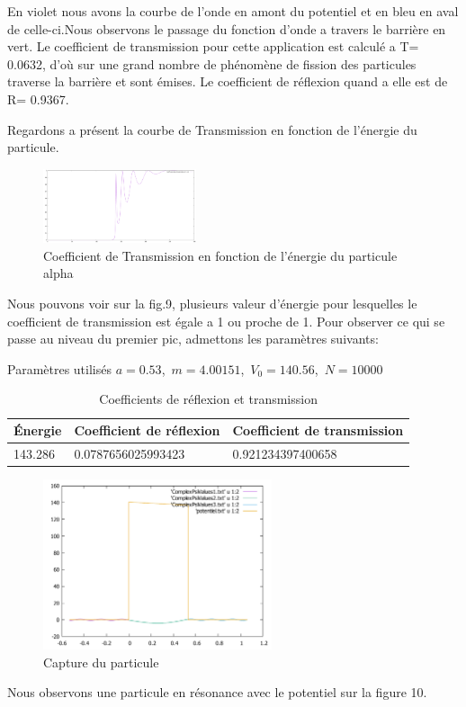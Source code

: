 \par En violet nous avons la courbe de l'onde en amont du potentiel et en bleu en aval de celle-ci.Nous observons le passage du fonction d'onde a travers le barrière en vert. Le coefficient de transmission pour cette application est calculé a T= 0.0632, d'où sur une grand nombre de phénomène de fission des particules traverse la barrière et sont émises. Le coefficient de réflexion quand a elle est de R= 0.9367.

\par Regardons a présent la courbe de Transmission en fonction de l'énergie du particule. 
\begin{figure}[!ht]
    \centering
    \includegraphics[width=0.4\textwidth]{Alpha/T(E).pdf}
    \caption{Coefficient de Transmission en fonction de l'énergie du particule alpha}
    \label{fig:my_label}
\end{figure}

Nous pouvons voir sur la fig.9, plusieurs valeur d'énergie pour lesquelles le coefficient de transmission est égale a 1 ou proche de 1. Pour observer ce qui se passe au niveau du premier pic, admettons les paramètres suivants:
\begin{table}[!ht]
\centering
Paramètres utilisés  $a=0.53$,\ $m=4.00151$,\ $V_{0}=140.56$,\ $N=10000$\\
\begin{tabular}{|l|l|l|}
\hline  Énergie & Coefficient de réflexion  & Coefficient de transmission \\
\hline  143.286 &  0.0787656025993423 &  0.921234397400658\\
\hline
\end{tabular}
\caption{Coefficients de réflexion et transmission}
\label{tab11}
\end{table}

\begin{figure}[!ht]
    \centering
    \includegraphics[width=0.6\textwidth]{AlphaResonnance/PsiReelResAplhaDecay.pdf}
    \caption{Capture du particule}
    \label{fig:my_label}
\end{figure}
\par Nous observons une particule en résonance avec le potentiel sur la figure 10. 


